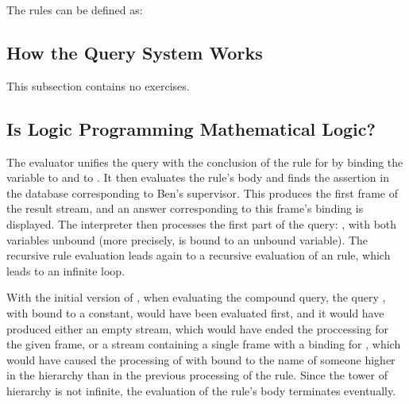 \begin{exe}[4.63]
    The rules can be defined as:
\end{exe}

\subsection{How the Query System Works}

This subsection contains no exercises.

\subsection{Is Logic Programming Mathematical Logic?}

\begin{exe}[4.64]
    \label{4.64}
    The evaluator unifies the query with the conclusion of the rule for 
     by binding the variable  to 
     and  to . It then evaluates 
    the rule’s body and finds the assertion in the database corresponding to 
    Ben’s supervisor. This produces the first frame of the result stream, and an 
    answer corresponding to this frame’s binding is displayed. The interpreter 
    then processes the first part of the  query:
    , with both variables unbound 
    (more precisely,  is bound to an unbound variable). The 
    recursive rule evaluation leads again to a recursive evaluation of an 
     rule, which leads to an infinite loop.

    With the initial version of , when evaluating the 
    compound  query, the query
    , with  bound to 
    a constant, would have been evaluated first, and it would have produced 
    either an empty stream, which would have ended the proccessing for the given 
    frame, or a stream containing a single frame with a binding for 
    , which would have caused the processing of \linebreak
     with  bound to 
    the name of someone higher in the hierarchy than in the previous processing 
    of the rule. Since the tower of hierarchy is not infinite, the evaluation of 
    the rule’s body terminates eventually.
\end{exe}


